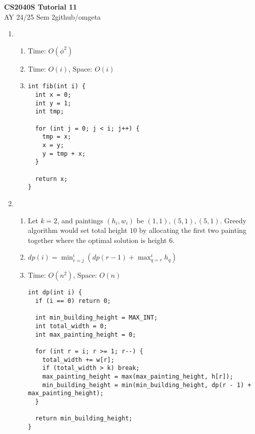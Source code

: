 \documentclass[12pt, a4paper]{article}
\newcommand{\mytitle}{CS2040S Tutorial 11 }
\newcommand{\myauthor}{github/omgeta}
\newcommand{\mydate}{AY 24/25 Sem 2}
\begin{document}
\raggedright
\footnotesize
\begin{center}
{\normalsize{\textbf{\mytitle}}} \\
{\footnotesize{\mydate\hspace{2pt}\textemdash\hspace{2pt}\myauthor}}
\end{center}
\begin{enumerate}[Q\arabic*.]
  \item 
    \begin{enumerate}[(\alph*.)]
      \item Time: $O(\phi^2)$

      \item Time: $O(i)$, Space: $O(i)$

      \item 
        \begin{lstlisting}
int fib(int i) {
  int x = 0;
  int y = 1;
  int tmp;

  for (int j = 0; j < i; j++) {
    tmp = x;
    x = y;
    y = tmp + x;
  }

  return x;
}
        \end{lstlisting}
    \end{enumerate}

  \item
    \begin{enumerate}[(\alph*.)]
      \item Let $k = 2$, and paintings $(h_i, w_i)$ be $(1, 1), (5, 1), (5, 1)$. Greedy algorithm would set total height $10$ by allocating the first two painting together where the optimal solution is height $6$.

      \item $dp(i) = \min^i_{r=j}(dp(r-1) + \max_{q=r}^i h_q)$ 

      \item Time: $O(n^2)$, Space: $O(n)$ 
        \begin{lstlisting}
int dp(int i) {
  if (i == 0) return 0;

  int min_building_height = MAX_INT;
  int total_width = 0;
  int max_painting_height = 0;

  for (int r = i; r >= 1; r--) {
    total_width += w[r];
    if (total_width > k) break;
    max_painting_height = max(max_painting_height, h[r]);
    min_building_height = min(min_building_height, dp(r - 1) + max_painting_height);
  }

  return min_building_height;
}

        \end{lstlisting}
    \end{enumerate}
\end{enumerate}
\end{document}
